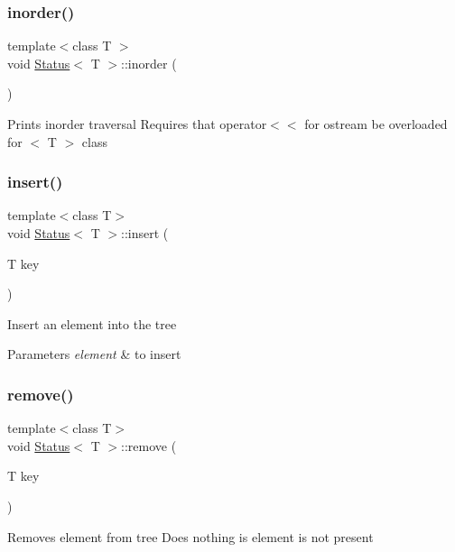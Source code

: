 \subsubsection{\texorpdfstring{inorder()}{inorder()}}
{\footnotesize\ttfamily template$<$class T $>$ \\
void \hyperlink{classStatus}{Status}$<$ T $>$\+::inorder (\begin{DoxyParamCaption}{ }\end{DoxyParamCaption})}

Prints inorder traversal Requires that operator$<$$<$ for ostream be overloaded for $<$ T $>$ class \mbox{\label{classStatus_a5fd5e49c03713d3b918010a15595d169}} 
\subsubsection{\texorpdfstring{insert()}{insert()}}
{\footnotesize\ttfamily template$<$class T$>$ \\
void \hyperlink{classStatus}{Status}$<$ T $>$\+::insert (\begin{DoxyParamCaption}\item[{T}]{key }\end{DoxyParamCaption})}

Insert an element into the tree 
\begin{DoxyParams}{Parameters}
{\em element} & to insert \\
\hline
\end{DoxyParams}
\mbox{\label{classStatus_afe333856c09425b4e0c7071ab4a700a5}} 
\subsubsection{\texorpdfstring{remove()}{remove()}}
{\footnotesize\ttfamily template$<$class T$>$ \\
void \hyperlink{classStatus}{Status}$<$ T $>$\+::remove (\begin{DoxyParamCaption}\item[{T}]{key }\end{DoxyParamCaption})}

Removes element from tree Does nothing is element is not present \mbox{\label{classStatus_a0b6a56cd7787478d30814c372ce7aff3}} 
